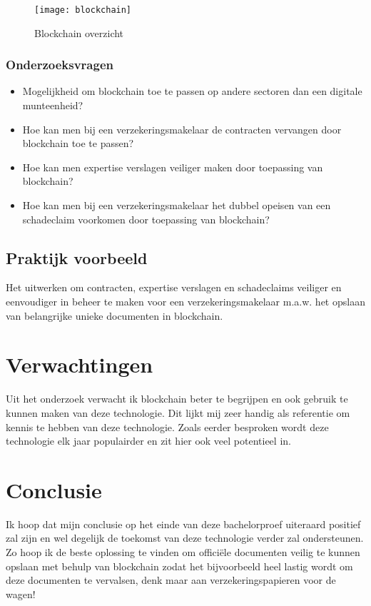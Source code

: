 \documentclass[fleqn,10pt]{voorstel}
\begin{document}
\begin{figure}[H]
    \texttt{[image: blockchain]}
    \caption{Blockchain overzicht}
\end{figure}

\newpage
\subsubsection{Onderzoeksvragen}
\begin{itemize}
\item Mogelijkheid om blockchain toe te passen op andere sectoren dan een digitale munteenheid?
\item Hoe kan men bij een verzekeringsmakelaar de  contracten vervangen door blockchain toe te passen?
\item Hoe kan men expertise verslagen veiliger maken door toepassing van blockchain?
\item Hoe kan men bij een verzekeringsmakelaar het dubbel opeisen van een schadeclaim voorkomen door toepassing van blockchain?
\end{itemize}

\subsection{Praktijk voorbeeld}
Het uitwerken om contracten, expertise verslagen en schadeclaims veiliger en eenvoudiger in beheer te maken voor een verzekeringsmakelaar m.a.w. het opslaan van belangrijke unieke documenten in blockchain.
\newline

\newpage
\section{Verwachtingen}
Uit het onderzoek verwacht ik blockchain beter te begrijpen en ook gebruik te kunnen maken van deze technologie. Dit lijkt mij zeer handig als referentie om kennis te hebben van deze technologie. Zoals eerder besproken wordt deze technologie elk jaar populairder en zit hier ook veel potentieel in.

\section{Conclusie}
Ik hoop dat mijn conclusie op het einde van deze bachelorproef uiteraard positief zal zijn en wel degelijk de toekomst van deze technologie verder zal ondersteunen. Zo hoop ik de beste oplossing te vinden om offici\"ele documenten veilig te kunnen opslaan met behulp van blockchain zodat het bijvoorbeeld heel lastig wordt om deze documenten te vervalsen, denk maar aan verzekeringspapieren voor de wagen!
\end{document}
